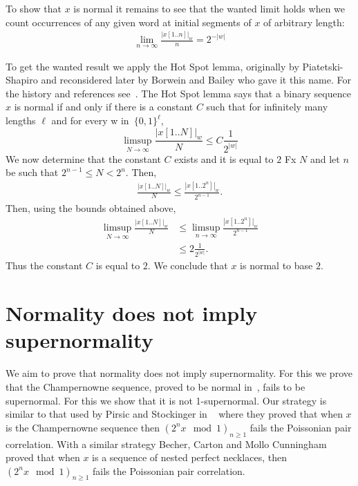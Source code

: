 \documentclass[11pt,a4paper]{tesis}
\begin{document}
To show that $x$ is normal it remains to see that the wanted 
limit holds when we count occurrences of any given word at initial segments of $x$ of arbitrary length:
\begin{align*}
\lim_{n\to \infty}\frac{|x[1.. n]|_w }{ n}= {2^{-|w|}}
\end{align*}

To get the wanted result we apply the  Hot Spot lemma, originally by Piatetski-Shapiro  and reconsidered 
later by Borwein and Bailey \cite{hotspot}  who gave it this name. For  the history and references see~\cite[Theorem 7.4.1]{BC2018}.
The Hot Spot lemma says that a binary sequence $x$ is normal if and only if there is a constant $C$ 
such that for infinitely many lengths $\ell$ and for every w in~$\{0,1\}^\ell$,
    $$\limsup_{N\to \infty}  \frac{|x[1.. N]|_w }{N} \leq C \frac{1}{2^{|w|}}$$
 We now determine that the constant $C$ exists and it is equal to $2$
Fx $N$ and let $n$ be such that $2^{n-1}\leq N<2^{n}$. 
Then,
\begin{align*}
\frac{{|x[1.. N]|_w }}{N}\leq \frac{{|x[1.. 2^{n}]|_w }}{2^{n-1}}.
\end{align*}
Then, using the bounds obtained above,
\begin{align*}
\limsup_{N\to \infty}  \frac{|x[1.. N]|_w }{N} 
&\leq \limsup_{n\to \infty}\frac{{|x[1.. 2^{n}]|_w }}{2^{n-1}}\\
&\leq 2\frac{1}{2^{|w|}}.
\end{align*}
Thus the constant $C$ is equal to $2$.
We conclude that $x$ is normal to base $2$.
\pagebreak

\section{Normality does not imply supernormality}
We aim to prove that normality does not imply supernormality. 
For this we prove that the Champernowne sequence, proved to be normal in~\cite{champern}, 
fails to be supernormal. For this we show that  it is not 1-supernormal.
Our strategy is similar to that used by Pirsic and Stockinger in ~\cite{PS2019}  where they proved that when $x$ is 
the Champernowne 
sequence then $(2^n x \mod 1)_{n\geq 1}$ fails the Poissonian pair correlation.
With a similar strategy  Becher, Carton and Mollo Cunningham ~\cite{BCC2019}
 proved that when $x$ is a sequence of nested perfect necklaces, then $(2^n x \mod 1)_{n\geq 1}$ fails the Poissonian pair correlation.
\end{document}
